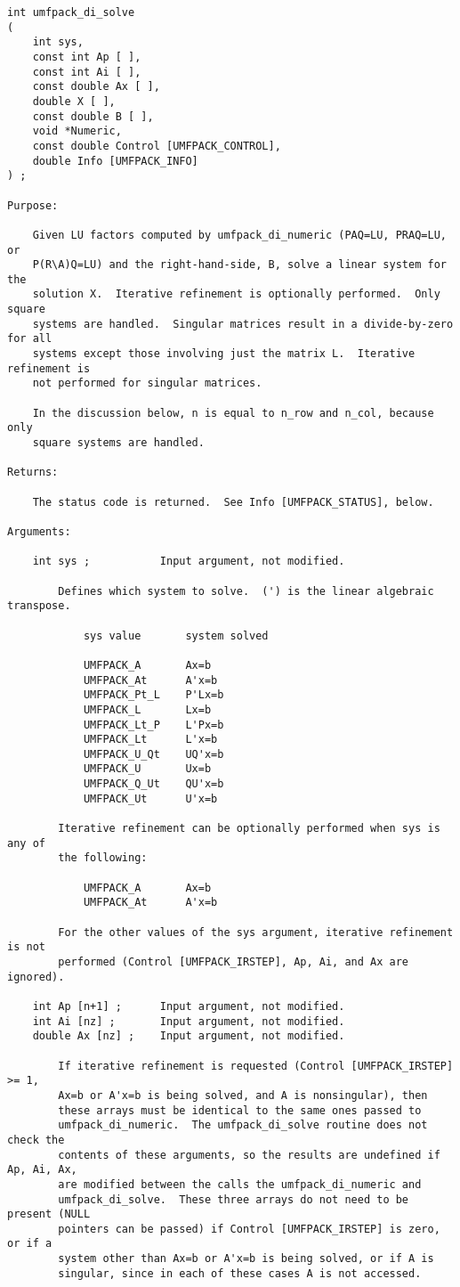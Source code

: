 \documentclass[11pt]{article}
\begin{document}
{\footnotesize
\begin{verbatim}
int umfpack_di_solve
(
    int sys,
    const int Ap [ ],
    const int Ai [ ],
    const double Ax [ ],
    double X [ ],
    const double B [ ],
    void *Numeric,
    const double Control [UMFPACK_CONTROL],
    double Info [UMFPACK_INFO]
) ;

Purpose:

    Given LU factors computed by umfpack_di_numeric (PAQ=LU, PRAQ=LU, or
    P(R\A)Q=LU) and the right-hand-side, B, solve a linear system for the
    solution X.  Iterative refinement is optionally performed.  Only square
    systems are handled.  Singular matrices result in a divide-by-zero for all
    systems except those involving just the matrix L.  Iterative refinement is
    not performed for singular matrices.

    In the discussion below, n is equal to n_row and n_col, because only
    square systems are handled.

Returns:

    The status code is returned.  See Info [UMFPACK_STATUS], below.

Arguments:

    int sys ;           Input argument, not modified.

        Defines which system to solve.  (') is the linear algebraic transpose.

            sys value       system solved

            UMFPACK_A       Ax=b
            UMFPACK_At      A'x=b
            UMFPACK_Pt_L    P'Lx=b
            UMFPACK_L       Lx=b
            UMFPACK_Lt_P    L'Px=b
            UMFPACK_Lt      L'x=b
            UMFPACK_U_Qt    UQ'x=b
            UMFPACK_U       Ux=b
            UMFPACK_Q_Ut    QU'x=b
            UMFPACK_Ut      U'x=b

        Iterative refinement can be optionally performed when sys is any of
        the following:

            UMFPACK_A       Ax=b
            UMFPACK_At      A'x=b

        For the other values of the sys argument, iterative refinement is not
        performed (Control [UMFPACK_IRSTEP], Ap, Ai, and Ax are ignored).

    int Ap [n+1] ;      Input argument, not modified.
    int Ai [nz] ;       Input argument, not modified.
    double Ax [nz] ;    Input argument, not modified.

        If iterative refinement is requested (Control [UMFPACK_IRSTEP] >= 1,
        Ax=b or A'x=b is being solved, and A is nonsingular), then
        these arrays must be identical to the same ones passed to
        umfpack_di_numeric.  The umfpack_di_solve routine does not check the
        contents of these arguments, so the results are undefined if Ap, Ai, Ax,
        are modified between the calls the umfpack_di_numeric and
        umfpack_di_solve.  These three arrays do not need to be present (NULL
        pointers can be passed) if Control [UMFPACK_IRSTEP] is zero, or if a
        system other than Ax=b or A'x=b is being solved, or if A is
        singular, since in each of these cases A is not accessed.


\end{verbatim}}
\end{document}
